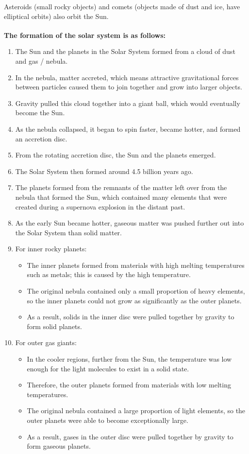 \documentclass[a4paper,12pt]{article}
\begin{document}
Asteroids (small rocky objects) and comets (objects made of dust and ice, have elliptical orbits) also orbit the Sun.\\\\
\textbf{The formation of the solar system is as follows:}
\begin{enumerate}
    \item The Sun and the planets in the Solar System formed from a cloud of dust and gas / nebula.
    \item In the nebula, matter accreted, which means attractive gravitational forces between particles caused them to join together and grow into larger objects.
    \item Gravity pulled this cloud together into a giant ball, which would eventually become the Sun.
    \item As the nebula collapsed, it began to spin faster, became hotter, and formed an accretion disc.
    \item From the rotating accretion disc, the Sun and the planets emerged.
    \item The Solar System then formed around 4.5 billion years ago.
    \item The planets formed from the remnants of the matter left over from the nebula that formed the Sun, which contained many elements that were created during a supernova explosion in the distant past. 
    \item As the early Sun became hotter, gaseous matter was pushed further out into the Solar System than solid matter.
    \item For inner rocky planets:
    \begin{itemize}
        \item The inner planets formed from materials with high melting temperatures such as metals; this is caused by the high temperature.
        \item The original nebula contained only a small proportion of heavy elements, so the inner planets could not grow as significantly as the outer planets.
        \item As a result, solids in the inner disc were pulled together by gravity to form solid planets.
    \end{itemize}
    \item For outer gas giants:
    \begin{itemize}
        \item In the cooler regions, further from the Sun, the temperature was low enough for the light molecules to exist in a solid state.
        \item Therefore, the outer planets formed from materials with low melting temperatures.
        \item The original nebula contained a large proportion of light elements, so the outer planets were able to become exceptionally large.
        \item As a result, gases in the outer disc were pulled together by gravity to form gaseous planets.
    \end{itemize}
\end{enumerate}
\end{document}
